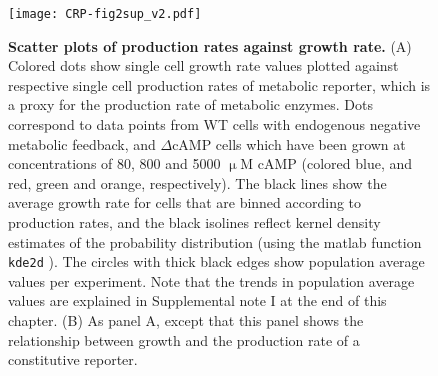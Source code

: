 \clearpage







\begin{figure}
	\centering
	\texttt{[image: CRP-fig2sup\_v2.pdf]}
	\caption{ 
	\textbf{Scatter plots of production rates against growth rate.}
	(A) Colored dots show single cell growth rate values plotted against respective single cell production rates of metabolic reporter, which is a proxy for the production rate of metabolic enzymes. 	
	Dots correspond to data points from WT cells with endogenous negative metabolic feedback, and $\Delta$cAMP cells which have been grown at concentrations of 80, 800 and 5000 $\upmu$M cAMP 
	(colored blue, and red, green and orange, respectively).
	The black lines show the average growth rate for cells that are binned according to production rates, and the black isolines reflect kernel density estimates of the probability distribution (using the matlab function \texttt{kde2d} \cite{Botev2010}).
	The circles with thick black edges show population average values per experiment.
	Note that the trends in population average values are explained in Supplemental note I at the end of this chapter.
	(B) As panel A, except that this panel shows the relationship between growth and the production rate of a constitutive reporter. 	
	}
	\label{fig:CRP:fig2sup}
\end{figure}

